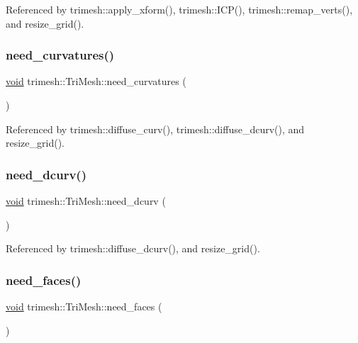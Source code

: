 Referenced by trimesh\+::apply\+\_\+xform(), trimesh\+::\+I\+C\+P(), trimesh\+::remap\+\_\+verts(), and resize\+\_\+grid().

\mbox{\label{classtrimesh_1_1TriMesh_a36a182d23184c10de8a594e0a5968f9f}} 
\subsubsection{\texorpdfstring{need\+\_\+curvatures()}{need\_curvatures()}}
{\footnotesize\ttfamily \hyperlink{namespacetrimesh_a784ddfd979e1c579bda795a8edfc3f43}{void} trimesh\+::\+Tri\+Mesh\+::need\+\_\+curvatures (\begin{DoxyParamCaption}{ }\end{DoxyParamCaption})}



Referenced by trimesh\+::diffuse\+\_\+curv(), trimesh\+::diffuse\+\_\+dcurv(), and resize\+\_\+grid().

\mbox{\label{classtrimesh_1_1TriMesh_a42bb868fc0fa13643520084f50579a52}} 
\subsubsection{\texorpdfstring{need\+\_\+dcurv()}{need\_dcurv()}}
{\footnotesize\ttfamily \hyperlink{namespacetrimesh_a784ddfd979e1c579bda795a8edfc3f43}{void} trimesh\+::\+Tri\+Mesh\+::need\+\_\+dcurv (\begin{DoxyParamCaption}{ }\end{DoxyParamCaption})}



Referenced by trimesh\+::diffuse\+\_\+dcurv(), and resize\+\_\+grid().

\mbox{\label{classtrimesh_1_1TriMesh_a572f3bf7bd1079fbdb60f5bb39a41492}} 
\subsubsection{\texorpdfstring{need\+\_\+faces()}{need\_faces()}}
{\footnotesize\ttfamily \hyperlink{namespacetrimesh_a784ddfd979e1c579bda795a8edfc3f43}{void} trimesh\+::\+Tri\+Mesh\+::need\+\_\+faces (\begin{DoxyParamCaption}{ }\end{DoxyParamCaption})\hspace{0.3cm}{\ttfamily [inline]}}



